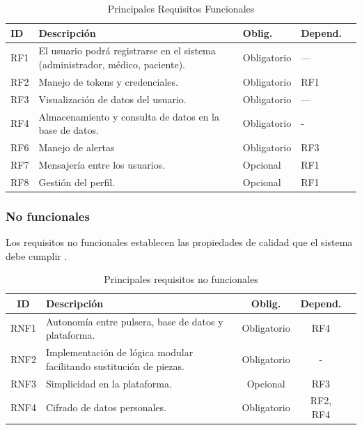 \documentclass[12pt, a4paper]{article}
\begin{document}
			
			\begin{table}[ht]
				\centering
				\caption{Principales Requisitos Funcionales}
				\begin{tabular}{|p{1.5cm}|p{6cm}|p{2cm}|p{2cm}|p{3cm}|}
					\hline
					\textbf{ID} & \textbf{Descripción} & \textbf{Oblig.} & \textbf{Depend.} \\
					\hline
					RF1 & El usuario podrá registrarse en el sistema (administrador, médico, paciente). & Obligatorio & —    \\
					\hline
					RF2 & Manejo de tokens y credenciales.                       & Obligatorio & RF1 \\
					\hline
					RF3 & Visualización de datos del usuario. & Obligatorio & —    \\
					\hline
					RF4 & Almacenamiento y consulta de datos en la base de datos.         & Obligatorio & - \\
					\hline
					RF6 & Manejo de alertas             & Obligatorio & RF3  \\
					\hline
					RF7 & Mensajería entre los usuarios.                              & Opcional   & RF1 \\
					\hline
					RF8 & Gestión del perfil.               & Opcional & RF1 \\
					\hline
				\end{tabular}
			\end{table}
	
	
	
		\subsubsection{No funcionales}
		
		Los requisitos no funcionales establecen las propiedades de calidad que el sistema debe cumplir \cite{ieee830}.
		
		\begin{table}[ht]
			\centering
			\caption{Principales requisitos no funcionales}
			\label{tab:req-no-funcionales}
			\begin{tabular}{|c|p{6cm}|c|c|c|}
				\hline
				\textbf{ID} & \textbf{Descripción} & \textbf{Oblig.} & \textbf{Depend.}  \\
				\hline
				RNF1 & Autonomía entre pulsera, base de datos y plataforma. & Obligatorio & RF4 \\
				\hline
				RNF2 & Implementación de lógica modular facilitando sustitución de piezas. & Obligatorio & -  \\
				\hline
				RNF3 & Simplicidad en la plataforma. & Opcional & RF3\\
				\hline
				RNF4 & Cifrado de datos personales. & Obligatorio & RF2, RF4 \\
				\hline
			\end{tabular}
		\end{table}
\end{document}
